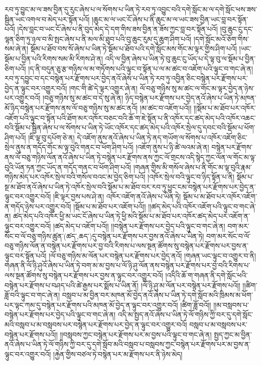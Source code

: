རབ་ཏུ་བྱུང་མ་ལ་ཟས་བྱིན་དུ་རུང་ཞེས་པ་ལ་སོགས་པ་ཡིན་ཏེ་རབ་ཏུ་འབྱུང་བའི་དགེ་སློང་མ་ལ་དགེ་སློང་ཕས་ཟས་སྦྱིན་ཡང་འགལ་བ་མེད་པར་སྟོན་པའོ། །ཆུང་མ་ལ་ཡང་ངོ་ཞེས་པ་ནི་ཆུང་མ་ལ་ཡང་ཟས་བྱིན་ཡང་བླ་བར་སྟོན་པའོ། །དེས་བླང་བ་ཡང་ངོ་ཞེས་པ་ནི་བུད་མེད་དེ་དག་གིས་ཟས་བྱིན་ན་ཟོས་ཀྱང་བླ་བར་སྟོན་པའོ། །བུ་ཆུང་ངུ་དང་ལྷན་ཅིག་ཏུ་ཉལ་བ་མི་སྤང་ཞེས་པ་ནི་མལ་མི་ཐུབ་པའི་བུ་ཆུང་རུམ་དུ་ཆུག་ཤིག་པའོ། །དགེ་སློང་མའོ་ཅོག་གིས་སམ་ཞེ་ན། སྡོམ་པ་ཐོབ་བས་སོ་ཞེས་པ་ཡིན་ཏེ་སྡོམ་པ་ཐོབ་པའི་དགེ་སློང་མས་གོང་མ་ལྟར་གྱིས་ཤིག་པའོ། །ཡང་སྡོམ་པ་བྱིན་པའི་རིགས་སམ་མི་རིགས་ཤེ་ན། འདི་ལ་བྱིན་ཞེས་པ་ཡིན་ཏེ་བུ་ཆུང་ངུ་ཡོད་པ་དེ་ལྟ་བུ་ལ་སྡོམ་པ་བྱིན་ཅིག་པའོ། །ད་ནི་བདུན་ཅུ་རྩ་གཉིས་ལ་མ་གཏོགས་པའི་ལྟུང་བ་སྟོན་པ་ལ་མ་ཚང་བ་འཇོག་པའི་ལྟུང་བ་གང་ཞེ་ན། རབ་ཏུ་དབྱུང་བ་དང་བསྙེན་པར་རྫོགས་པར་བྱེད་ནའོ་ཞེས་པ་ཡིན་ཏེ་རབ་ཏུ་འབྱིན་ཅིང་བསྙེན་པར་རྫོགས་པར་བྱེད་ན་ལྟུང་བར་འགྱུར་བའོ། །གང་གི་ཚེ་དེ་ལྟར་འགྱུར་ཞེ་ན། ལོ་བཅུ་གཉིས་སུ་མ་ཚང་ལ་གོང་མ་ལྟར་བྱེད་ན་ཉེས་པར་འགྱུར་བའོ། །བཅུ་གཉིས་སུ་མ་ཚང་བ་དེ་སུ་ཞེ་ན། ཉིད་བསྙེན་པར་རྫོགས་པར་བྱེད་ནའོ་ཞེས་པ་ཡིན་ཏེ་མཁན་མོ་ཉིད་བསྙེན་པར་རྫོགས་ནས་ལོ་བཅུ་གཉིས་སུ་མ་ཚང་ནའོ། །མ་ཚང་བ་འཇོག་པའོ།། །།སྡོམ་པ་མ་ཐོབ་པར་འཁོར་འཇོག་པའི་ལྟུང་བ་སྟོན་པའི་ཐོག་མར་འཁོར་བཅང་བའི་ཆོ་ག་ཇེ་སྟོན་པ་ནི་འཁོར་དང་ཚད་མེད་པའི་འཁོར་འཆང་བའི་སྡོམ་པ་སྦྱིན་ཞེས་པ་ལ་སོགས་པ་ཡིན་ཏེ་ཡོང་འཁོར་དང་ཚད་མེད་པའི་འཁོར་སྲེལ་དུ་དབང་བའི་སྡོམ་པ་ཕོག་ཤིག་པའོ། །ཇི་ལྟ་བུ་དཔོག་ཅེ་ན། དེ་འཇོག་ནུས་ནའོ་ཞེས་པ་ཡིན་ཏེ་ནད་གཡོག་ལ་སོགས་པ་འཁོར་འཇོག་ཅིང་སྲེལ་ནུས་ན་གདོད་གོང་མ་ལྟ་བུའི་གནང་བ་ཕོག་ཤིག་པའོ། །འཇོག་ནུས་པ་ཉི་ཚེ་ལའམ་ཞེ་ན། བསྙེན་པར་རྫོགས་ནས་ལོ་བཅུ་གཉིས་ལོན་ནའོ་ཞེས་པ་ཡིན་ཏེ་བསྙེན་པར་རྫོགས་ནས་ཀྱང་ལོ་གྲངས་འདི་སྙེད་ཀྱང་ལོན་ལ་གོང་མ་ལྟ་བུའི་ཡོན་ཏན་ཀྱང་ཡོད་ན་གདོད་གནང་བ་ཕོག་ཤིག་པའོ། །གཞན་གྱིས་མི་གསོལ་ཞེས་པ་ནི་གོང་མ་ལྟ་བུའི་རྣམ་གཉིས་མེད་པར་འཁོར་སྲེལ་བའི་གསོལ་བའང་མ་བྱེད་ཅིག་པའོ། །འཁོར་སྲེལ་བའི་ལྟུང་བ་ཉིད་སྟོན་པ་ནི། སྡོམ་པ་སྔ་མ་ཐོབ་ནའོ་ཞེས་པ་ཡིན་ཏེ་འཁོར་སྲེལ་བའི་སྡོམ་པ་མ་ཐོབ་བར་རབ་ཏུ་ཕྱུང་ངམ་བསྙེན་པར་རྫོགས་པར་བྱེད་ན་ལྟུང་བར་འགྱུར་བའོ། །ཇི་ལྟར་བྱས་པས་ཤེ་ན། འཁོར་འཇོག་ནའོ་ཞེས་པ་ཡིན་ཏེ། སྡོམ་པ་མ་ཐོབ་པར་འཁོར་འཇོག་ན་གདོད་ཉེས་པར་འགྱུར་བའོ། །སྡོམ་པ་མ་ཐོབ་པར་འཇོག་པའོ།། །།ཚད་མེད་པའི་འཁོར་འཇོག་པའི་ལྟུང་བ་གང་ཞེ་ན། ཚད་མེད་པའི་འཁོར་ཕྱི་མ་ཡང་ངོ་ཞེས་པ་ཡིན་ཏེ་ཕྱི་མའི་སྡོམ་པ་མ་ཐོབ་པར་འཁོར་ཚད་མེད་པར་འཇོག་ན་ལྟུང་བར་འགྱུར་བའོ། །ཚད་མེད་པ་འཇོག་པའོ།། །།བསྙེན་པར་རྫོགས་པར་བྱེད་པའི་ལྟུང་བ་གང་ཞེ་ན། བག་མར་སོང་བ་ལོ་བཅུ་གཉིས་ཚུན་(ཚད་‚ཆད་)དུ་བསྙེན་པར་རྫོགས་པར་བྱས་ནའོ་ཞེས་པ་ཡིན་ཏེ། བག་མར་སོང་བ་ལོ་བཅུ་གཉིས་ལོན་ན་བསྙེན་པར་རྫོགས་པར་བྱ་བའི་རིགས་པ་ལས་སྔན་ཚོགས་སུ་བསྙེན་པར་རྫོགས་པར་བྱས་ན་ལྟུང་བར་སྟོན་པའོ། །ལོ་བཅུ་གཉིས་མ་ལོན་པར་བསྙེན་པར་རྫོགས་པར་བྱེད་ནའོ། །གཞན་ཡང་ལྟུང་བ་འགྱུར་བ་ནི། གཞན་ནི་ལོ་ཉི་ཤུའོ་ཞེས་པ་ཡིན་ཏེ་བག་མ་མ་བྱས་པ་ལོ་ཉི་ཤུ་ལོན་ནས་བསྙེན་པར་རྫོགས་པར་བྱ་བའི་རིགས་པ་ལས་སྔན་ཚོགས་སུ་བསྙེན་པར་རྫོགས་པར་བྱས་ན་ལྟུང་བར་འགྱུར་བའོ། །འདིའི་ཆོ་ག་གཞན་ནི་དགེ་སློང་ཕའི་བསྙེན་པར་རྫོགས་པ་བཤད་པའི་ཚེ་རྒྱས་པར་སྨོས་པ་ཡིན་ནོ། །ལོ་ཉི་ཤུ་མ་ལོན་པར་བསྙེན་པར་རྫོགས་པའོ།། །།ཚིག་ཟློ་བའི་ལྟུང་བ་གང་ཞེ་ན། བསླབ་པ་མ་བྱིན་བར་མཁན་མོ་བྱེད་ནའོ་ཞེས་པ་ཡིན་ཏེ་དགེ་སློབ་མའི་ཁྲིམས་མ་ཕོག་པར་ལྟང་ཀམ་དུ་བསྙེན་པར་རྫོགས་པའི་མཁན་མོ་བྱེད་ན་ལྟུང་བར་འགྱུར་བའོ། །ཚིག་ཟློ་བའོ།། །།མ་བསླབས་པ་བསྙེན་པར་རྫོགས་པར་བྱེད་པའི་ལྟུང་བ་གང་ཞེ་ན། འདི་མ་སྤྱད་ནའོ་ཞེས་པ་ཡིན་ཏེ་ལོ་གཉིས་ཀྱི་བར་དུ་དགེ་སློང་མའི་བསླབ་པ་མ་བསླབས་པར་བསྙེན་པར་རྫོགས་པར་བྱེད་ན་ལྟུང་བར་འགྱུར་བའོ། བསླབ་པ་མ་བསླབས་པར་བསྙེན་པར་རྫོགས་པའོ།། །།བསླབས་ཀྱང་བསྙེན་པར་རྫོགས་པར་མ་བྱས་པའི་ལྟུང་བ་གང་ཞེ་ན། སྤྱད་ཀྱང་མ་བྱིན་ནའོ་ཞེས་པ་ཡིན་ཏེ་ལོ་གཉིས་ཀྱི་བར་དུ་དགེ་སློབ་མའི་བསླབ་པ་བསླབས་ཀྱང་བསྙེན་པར་རྫོགས་པར་མ་བྱས་ན་ལྟུང་བར་འགྱུར་བའོ། །རྐྱེན་གྱིས་བཙལ་ཏེ་བསྙེན་པར་མ་རྫོགས་པར་ནི་ཉེས་མེད། 